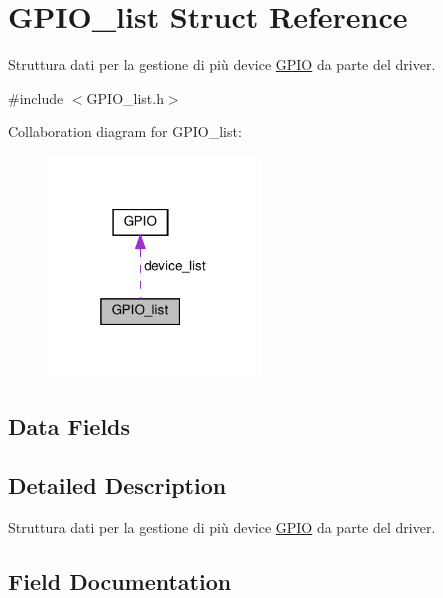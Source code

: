 \hypertarget{structGPIO__list}{}\section{G\+P\+I\+O\+\_\+list Struct Reference}
\label{structGPIO__list}


Struttura dati per la gestione di più device \hyperlink{structGPIO}{G\+P\+IO} da parte del driver.  




{\ttfamily \#include $<$G\+P\+I\+O\+\_\+list.\+h$>$}



Collaboration diagram for G\+P\+I\+O\+\_\+list\+:\nopagebreak
\begin{figure}[H]
\begin{center}
\leavevmode
\includegraphics[width=160pt]{structGPIO__list__coll__graph}
\end{center}
\end{figure}
\subsection*{Data Fields}


\subsection{Detailed Description}
Struttura dati per la gestione di più device \hyperlink{structGPIO}{G\+P\+IO} da parte del driver. 

\subsection{Field Documentation}
\mbox{\label{structGPIO__list_a170d1d78f27f6ab4c8badaaa4b3f2305}} 
